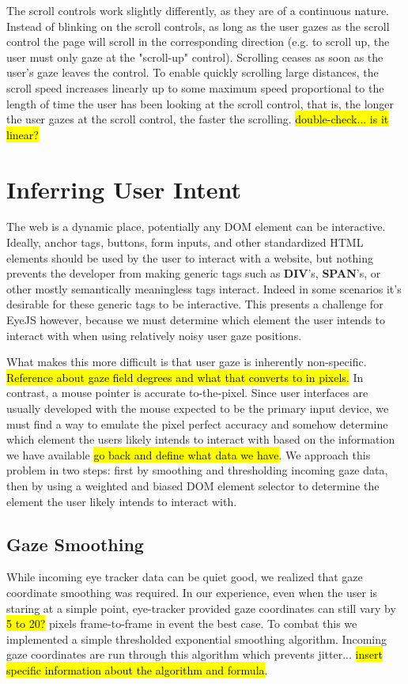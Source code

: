 \documentclass{sigchi}
\begin{document}
The scroll controls work slightly differently, as they are of a 
continuous nature. Instead of blinking on the scroll controls, as long
as the user gazes as the scroll control the page will scroll in the
corresponding direction (e.g. to scroll up, the user must only gaze
at the "scroll-up" control). Scrolling ceases as soon as the user's 
gaze leaves the control. To enable quickly scrolling large distances,
the scroll speed increases linearly up to some maximum speed 
proportional to the length of time the user has been looking at the 
scroll control, that is, the longer the user gazes at the scroll
control, the faster the scrolling. \hl{double-check... is it linear?}



\section{Inferring User Intent}
The web is a dynamic place, potentially any DOM element can be 
interactive. Ideally, anchor tags, buttons, form inputs, and other 
standardized HTML elements should be used by the user to interact with a 
website, but nothing prevents the developer from making generic tags
such as \textbf{DIV}'s, \textbf{SPAN}'s, or other mostly semantically 
meaningless tags interact. Indeed in some scenarios it's desirable for 
these generic tags to be interactive. This presents a challenge 
for EyeJS however, because we must determine which element the user 
intends to interact with when using relatively noisy user gaze positions.

What makes this more difficult is that user gaze is inherently 
non-specific. \hl{Reference about gaze field degrees and what 
that converts to in pixels.} In contrast, a mouse pointer is accurate
to-the-pixel. Since user interfaces are usually developed with the 
mouse expected to be the primary input device, we must find a way to
emulate the pixel perfect accuracy and somehow determine which element 
the users likely intends to interact with based on the information we
have available \hl{go back and define what data we have}. We approach
this problem in two steps: first by smoothing and thresholding incoming
gaze data, then by using a weighted and biased DOM element selector to
determine the element the user likely intends to interact with.


\subsection{Gaze Smoothing}
While incoming eye tracker data can be quiet good, we realized that 
gaze coordinate smoothing was required. In our experience, even when
the user is staring at a simple point, eye-tracker provided gaze 
coordinates can still vary by \hl{5 to 20?} pixels frame-to-frame in
event the best case. To combat this we implemented a simple 
thresholded exponential smoothing algorithm. Incoming gaze coordinates
are run through this algorithm which prevents jitter... \hl{insert 
specific information about the algorithm and formula}.
\end{document}

